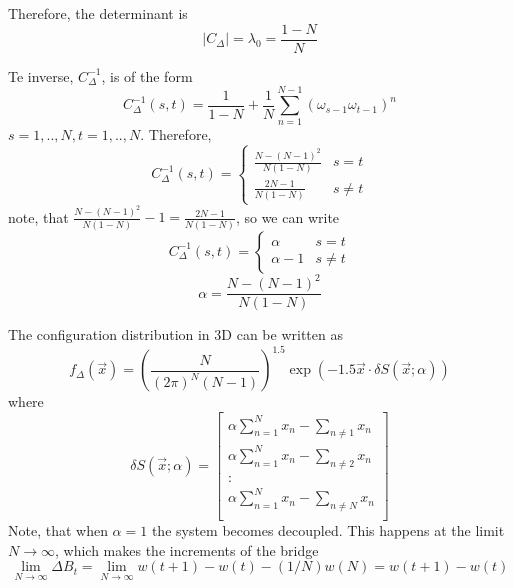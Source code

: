 \documentclass{report}
\begin{document}
Therefore, the determinant is
\begin{equation*}
|C_\Delta|=\lambda_0=\frac{1-N}{N}
\end{equation*}

Te inverse, $C_\Delta ^{-1}$, is of the form
\begin{equation*}
C_\Delta^{-1}(s,t)=
\frac{1}{1-N}+\frac{1}{N}\sum_{n=1}^{N-1}(\omega_{s-1}\omega_{t-1})^n
\end{equation*}
$s=1,..,N, t=1,..,N$. Therefore,
\begin{equation*}
C^{-1}_\Delta(s,t) = 
\begin{cases}
\frac{N-(N-1)^2}{N(1-N)} & s=t\\
\frac{2N-1}{N(1-N)}      & s\neq t
\end{cases}
\end{equation*}
note, that $\frac{N-(N-1)^2}{N(1-N)}-1 = \frac{2N-1}{N(1-N)} $, so we can write 
\begin{equation*}
C^{-1}_\Delta(s,t) = 
\begin{cases}
\alpha    & s=t\\
\alpha-1  & s\neq t
\end{cases}
\end{equation*}
\begin{equation*}
 \alpha=\frac{N-(N-1)^2}{N(1-N)}
\end{equation*}
 
The configuration distribution in 3D can be written as 
\begin{equation*}
f_\Delta(\vec{x})=\left(\frac{N}{(2\pi)^N (N-1)} \right)^{1.5}\exp(-1.5\vec{x}\cdot\delta S(\vec{x} ;\alpha))
\end{equation*}
where
\begin{equation*}
\delta S(\vec{x};\alpha)=\left[
\begin{matrix}
\alpha\sum_{n=1}^N x_n -\sum_{n\neq 1}x_n\\
\alpha\sum_{n=1}^N x_n -\sum_{n\neq 2}x_n\\
\colon\\
\alpha\sum_{n=1}^N x_n -\sum_{n\neq N}x_n\\
\end{matrix}
\right]
\end{equation*}
Note, that when $\alpha=1$ the system becomes decoupled. This happens at the limit $N\rightarrow \infty$, which makes the increments of the bridge 
\begin{equation*}
\lim_{N\rightarrow \infty} \Delta B_t=\lim_{N\rightarrow \infty} w(t+1)-w(t)-(1/N)w(N)= w(t+1)-w(t)
\end{equation*}
\end{document}
